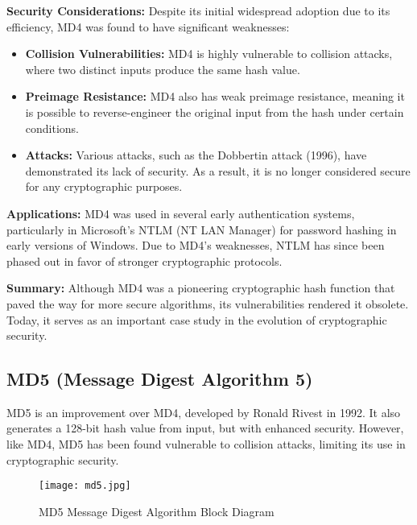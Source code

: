 \documentclass[a4paper,12pt]{article}
\begin{document}
\textbf{Security Considerations:} Despite its initial widespread adoption due to its efficiency, MD4 was found to have significant weaknesses:
\begin{itemize}
    \item \textbf{Collision Vulnerabilities:} MD4 is highly vulnerable to collision attacks, where two distinct inputs produce the same hash value.
    \item \textbf{Preimage Resistance:} MD4 also has weak preimage resistance, meaning it is possible to reverse-engineer the original input from the hash under certain conditions.
    \item \textbf{Attacks:} Various attacks, such as the Dobbertin attack (1996), have demonstrated its lack of security. As a result, it is no longer considered secure for any cryptographic purposes.
\end{itemize}


\textbf{Applications:} MD4 was used in several early authentication systems, particularly in Microsoft's NTLM (NT LAN Manager) for password hashing in early versions of Windows. Due to MD4's weaknesses, NTLM has since been phased out in favor of stronger cryptographic protocols.

\vspace{0.5cm}  %

\textbf{Summary:} Although MD4 was a pioneering cryptographic hash function that paved the way for more secure algorithms, its vulnerabilities rendered it obsolete. Today, it serves as an important case study in the evolution of cryptographic security.




\newpage  %
\subsection*{MD5 (Message Digest Algorithm 5)}
MD5 is an improvement over MD4, developed by Ronald Rivest in 1992. It also generates a 128-bit hash value from input, but with enhanced security. However, like MD4, MD5 has been found vulnerable to collision attacks, limiting its use in cryptographic security.

\begin{figure}[H]
    \centering
    \texttt{[image: md5.jpg]}  %
    \caption{MD5 Message Digest Algorithm Block Diagram}
    \label{fig:md5_diagram}
\end{figure}
\end{document}
